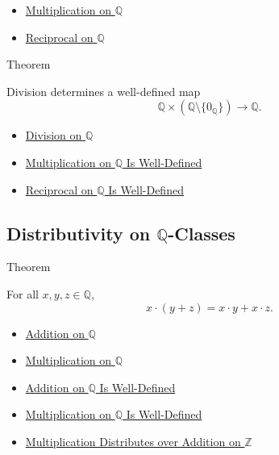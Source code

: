 \begin{dependencies}
\begin{itemize}
  \item \hyperref[def:multiplication-on-q-classes]{Multiplication on $\mathbb{Q}$}
  \item \hyperref[def:reciprocal-on-q-classes]{Reciprocal on $\mathbb{Q}$}
\end{itemize}
\end{dependencies}

\begin{theorembox}{Theorem}
\begin{theorem}
\label{thm:division-on-q-well-defined}
Division determines a well-defined map
\[
\mathbb{Q}\times(\mathbb{Q}\setminus\{0_{\mathbb{Q}}\})\to\mathbb{Q}.
\]
\end{theorem}
\end{theorembox}

\begin{dependencies}
\begin{itemize}
  \item \hyperref[def:division-on-q]{Division on $\mathbb{Q}$}
  \item \hyperref[thm:multiplication-on-q-well-defined]{Multiplication on $\mathbb{Q}$ Is Well-Defined}
  \item \hyperref[thm:reciprocal-on-q-well-defined]{Reciprocal on $\mathbb{Q}$ Is Well-Defined}
\end{itemize}
\end{dependencies}

\subsection*{Distributivity on $\mathbb{Q}$-Classes}

\begin{theorembox}{Theorem}
\begin{theorem}
\label{thm:left-distributivity-on-q}
For all $x,y,z\in\mathbb{Q}$,
\[
x\cdot(y+z)=x\cdot y+x\cdot z.
\]
\end{theorem}
\end{theorembox}

\begin{dependencies}
\begin{itemize}
  \item \hyperref[def:addition-on-q-classes]{Addition on $\mathbb{Q}$}
  \item \hyperref[def:multiplication-on-q-classes]{Multiplication on $\mathbb{Q}$}
  \item \hyperref[thm:addition-on-q-well-defined]{Addition on $\mathbb{Q}$ Is Well-Defined}
  \item \hyperref[thm:multiplication-on-q-well-defined]{Multiplication on $\mathbb{Q}$ Is Well-Defined}
  \item \hyperref[thm:multiplication-distributes-over-addition-on-z]{Multiplication Distributes over Addition on $\mathbb{Z}$}
\end{itemize}
\end{dependencies}

